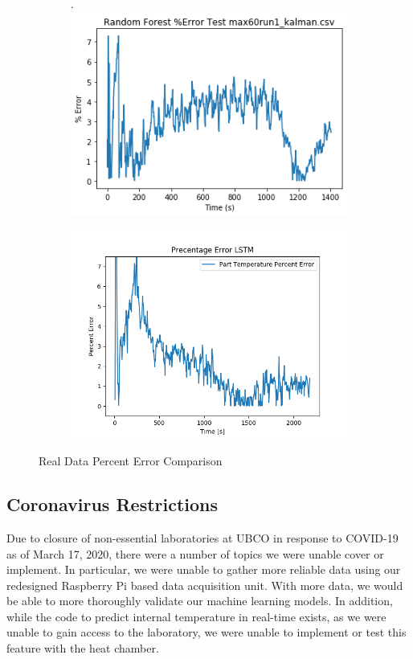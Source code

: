 \begin{figure}[ht]
    \begin{subfigure}{.5\linewidth}.
        \centering
    	\includegraphics[width=\linewidth]{other/RF_error_real.png}
    \end{subfigure}
    \begin{subfigure}{.5\linewidth}
    	\centering
    	\includegraphics[width=1.01\linewidth]{lstm/run1_rescale.png}
    	\vspace{.05pt}
    \end{subfigure}
    \caption{Real Data Percent Error Comparison}
    \label{fig:real_data_error_rs_lstm2}
\end{figure}
\newpage
\subsection{Coronavirus Restrictions}
Due to closure of non-essential laboratories at UBCO in response to COVID-19 as of March 17, 2020, there were a number of topics we were unable cover or implement. In particular, we were unable to gather more reliable data using our redesigned  Raspberry Pi based data acquisition unit. With more data, we would be able to more thoroughly validate our machine learning models. In addition, while the code to predict internal temperature in real-time exists, as we were unable to gain access to the laboratory, we were unable to implement or test this feature with the heat chamber.

